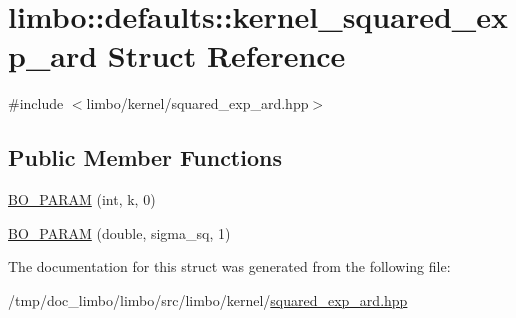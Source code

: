 \hypertarget{structlimbo_1_1defaults_1_1kernel__squared__exp__ard}{}\section{limbo\+:\+:defaults\+:\+:kernel\+\_\+squared\+\_\+exp\+\_\+ard Struct Reference}
\label{structlimbo_1_1defaults_1_1kernel__squared__exp__ard}


{\ttfamily \#include $<$limbo/kernel/squared\+\_\+exp\+\_\+ard.\+hpp$>$}

\subsection*{Public Member Functions}
\begin{DoxyCompactItemize}
\item 
\hyperlink{group__kernel__defaults_ga913157eccae4e432cb2fd43ec682773c}{B\+O\+\_\+\+P\+A\+R\+AM} (int, k, 0)
\item 
\hyperlink{group__kernel__defaults_ga5322933a812efe2019e375cd2b4875fc}{B\+O\+\_\+\+P\+A\+R\+AM} (double, sigma\+\_\+sq, 1)
\end{DoxyCompactItemize}


The documentation for this struct was generated from the following file\+:\begin{DoxyCompactItemize}
\item 
/tmp/doc\+\_\+limbo/limbo/src/limbo/kernel/\hyperlink{squared__exp__ard_8hpp}{squared\+\_\+exp\+\_\+ard.\+hpp}\end{DoxyCompactItemize}
